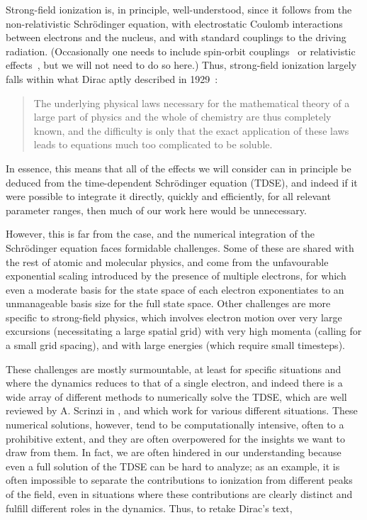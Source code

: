 Strong-field ionization is, in principle, well-understood, since it follows from the non-relativistic Schrödinger equation, with electrostatic Coulomb interactions between electrons and the nucleus, and with standard couplings to the driving radiation. (Occasionally one needs to include spin-orbit couplings~\cite{barth_spin-polarized_2013} or relativistic effects~\cite{milosevic_relativistic_2002}, but we will not need to do so here.) Thus, strong-field ionization largely falls within what Dirac aptly described in 1929~\cite{dirac_qm-many-electron_1929}:
%
\begin{quote}
The underlying physical laws necessary for the mathematical theory of a large part of physics and the whole of chemistry are thus completely known, and the difficulty is only that the exact application of these laws leads to equations much too complicated to be soluble.
\end{quote}
%
In essence, this means that all of the effects we will consider can in principle be deduced from the time-dependent Schrödinger equation (TDSE), and indeed if it were possible to integrate it directly, quickly and efficiently, for all relevant parameter ranges, then much of our work here would be unnecessary.

However, this is far from the case, and the numerical integration of the Schrödinger equation faces formidable challenges. Some of these are shared with the rest of atomic and molecular physics, and come from the unfavourable exponential scaling introduced by the presence of multiple electrons, for which even a moderate basis for the state space of each electron exponentiates to an unmanageable basis size for the full state space. Other challenges are more specific to strong-field physics, which involves electron motion over very large excursions (necessitating a large spatial grid) with very high momenta (calling for a small grid spacing), and with large energies (which require small timesteps).


These challenges are mostly surmountable, at least for specific situations and where the dynamics reduces to that of a single electron, and indeed there is a wide array of different methods to numerically solve the TDSE, which are well reviewed by A. Scrinzi in , and which work for various different situations. These numerical solutions, however, tend to be computationally intensive, often to a prohibitive extent, and they are often overpowered for the insights we want to draw from them. In fact, we are often hindered in our understanding because even a full solution of the TDSE can be hard to analyze; as an example, it is often impossible to separate the contributions to ionization from different peaks of the field, even in situations where these contributions are clearly distinct and fulfill different roles in the dynamics. Thus, to retake Dirac's text,

